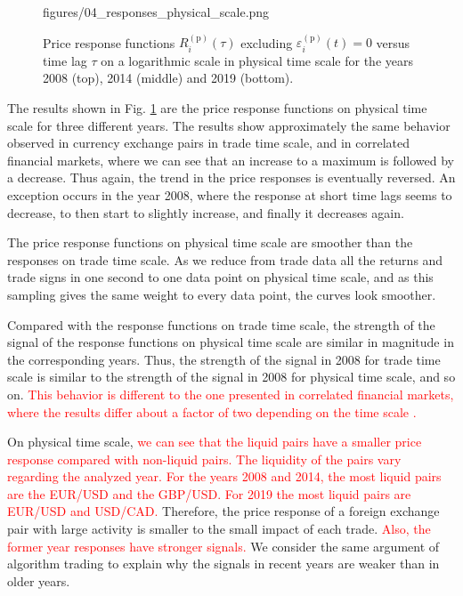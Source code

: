 \begin{figure}[htbp]
    {figures/04_responses_physical_scale.png}
    \caption{Price response functions
             $R^{\left(\textrm{p}\right)}_{i}\left(\tau\right)$ excluding
             $\varepsilon^{\left(\textrm{p}\right)}_{i}\left(t\right) = 0$ versus time
             lag $\tau$ on a logarithmic scale in physical time scale for the
             years 2008 (top), 2014 (middle) and 2019 (bottom).}
    \label{fig:response_function_physical_scale}
\end{figure}
The results shown in Fig. \ref{fig:response_function_physical_scale} are the
price response functions on physical time scale for three different years. The
results show approximately the same behavior observed in currency exchange
pairs in trade time scale, and in correlated financial markets, where we can
see that an increase to a maximum is followed by a decrease. Thus again, the
trend in the price responses is eventually reversed. An exception occurs in the
year 2008, where the response at short time lags seems to decrease, to then
start to slightly increase, and finally it decreases again.

The price response functions on physical time scale are smoother than the
responses on trade time scale. As we reduce from trade data all the returns and
trade signs in one second to one data point on physical time scale, and as this
sampling gives the same weight to every data point, the curves look smoother.

Compared with the response functions on trade time scale, the strength of the
signal of the response functions on physical time scale are similar in
magnitude in the corresponding years. Thus, the strength of the signal in 2008
for trade time scale is similar to the strength of the signal in 2008 for
physical time scale, and so on. \textcolor{red}{This behavior is different to the one presented
in correlated financial markets, where the results differ about a factor of
two depending on the time scale \cite{my_paper_response_financial}.}

On physical time scale, \textcolor{red}{we can see that the liquid pairs have a smaller price
response compared with non-liquid pairs. The liquidity of the pairs vary regarding
the analyzed year. For the years 2008 and 2014, the most liquid pairs are the EUR/USD
and the GBP/USD. For 2019 the most liquid pairs are EUR/USD and USD/CAD.} Therefore, the price response of a
foreign exchange pair with large activity is smaller to the small impact of
each trade. \textcolor{red}{Also, the former year responses have stronger signals.} We consider
the same argument of algorithm trading to explain why the signals in recent
years are weaker than in older years.
